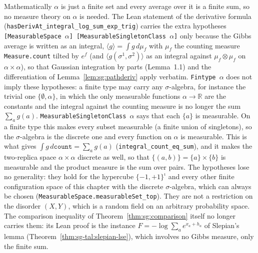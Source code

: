 \begin{remark}\label{rem:sg:measurablesingleton}
Mathematically $\alpha$ is just a finite set and every average over it is a finite sum, so no measure theory on $\alpha$ is needed.
The Lean statement of the derivative formula (\texttt{hasDerivAt\_integral\_log\_sum\_exp\_trig}) carries the extra hypotheses \texttt{[MeasurableSpace $\alpha$] [MeasurableSingletonClass $\alpha$]} only because
the Gibbs average is written as an integral, $\langle g\rangle=\int g\,d\mu_{f}$ with $\mu_f$ the counting measure \texttt{Measure.count}
tilted by $e^{f}$ (and $\langle g(\sigma^1,\sigma^2)\rangle$ as an integral against $\mu_f\otimes\mu_f$ on $\alpha\times\alpha$), so that
Gaussian integration by parts (Lemma~1.1) and the differentiation of Lemma~\ref{lem:sg:pathderiv} apply verbatim.
\texttt{Fintype $\alpha$} does not imply these hypotheses: a finite type may carry any $\sigma$-algebra, for instance the trivial one
$\{\emptyset,\alpha\}$, in which the only measurable functions $\alpha\to\mathbb R$ are the constants and the integral against the counting measure
is no longer the sum $\sum_ag(a)$. \texttt{MeasurableSingletonClass $\alpha$} says that each $\{a\}$ is measurable. On a finite type
this makes every subset measurable (a finite union of singletons), so the $\sigma$-algebra is the discrete one and every function on $\alpha$ is
measurable. This is what gives $\int g\,d\texttt{count}=\sum_ag(a)$ (\texttt{integral\_count\_eq\_sum}), and it makes the two-replica space
$\alpha\times\alpha$ discrete as well, so that $\{(a,b)\}=\{a\}\times\{b\}$ is measurable and the product measure is the sum over pairs.
The hypotheses lose no generality: they hold for the hypercube $\{-1,+1\}^\iota$ and every other finite configuration space of this
chapter with the discrete $\sigma$-algebra, which can always be chosen (\texttt{MeasurableSpace.measurableSet\_top}). They are not
a restriction on the disorder $(X,Y)$, which is a random field on an arbitrary probability space.
The comparison inequality of Theorem~\ref{thm:sg:comparison} itself no longer carries them: its Lean proof is the instance $F=-\log\sum_ae^{x_a+h_a}$ of Slepian's lemma (Theorem~\ref{thm:sg-tal:slepian-lse}), which involves no Gibbs measure, only the finite sum.
\end{remark}

